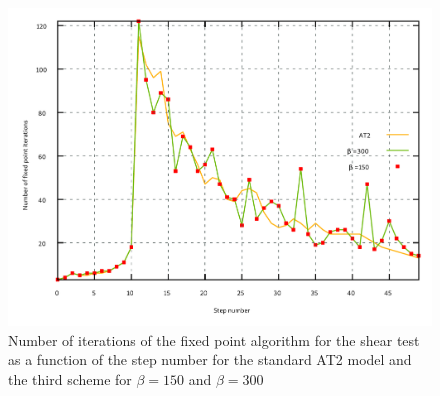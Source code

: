 
\begin{figure}[H]
  \centering
  \includegraphics[width=10.cm]{../chapter_02_ef_micromorphic/figures/shear-iterations.pdf}
  \caption{Number of iterations of the fixed point algorithm for the shear test
  as a function of the step number for the standard AT2 model and the
  third scheme for \(\beta=150\) and
  \(\beta=300\)}
  \label{fig:micromorphic_damage:shear:iterations}
\end{figure}



